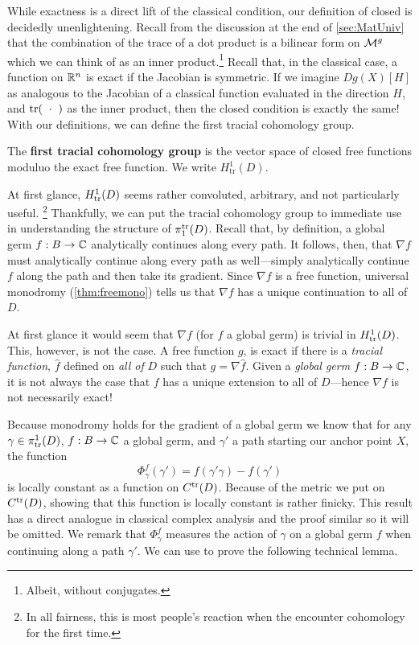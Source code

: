 While exactness is a direct lift of the classical condition, our definition of
closed is decidedly unenlightening. Recall from the discussion at the end of
\cref{sec:MatUniv} that the combination of the trace of a dot product is a
bilinear form on \(\mathcal{M}^{g} \) which we can think of as an inner
product.\footnote{Albeit, without conjugates.}
Recall that, in the classical case, a function on \(\mathbb{R} ^n\) is exact if the
Jacobian is symmetric.
If we imagine \(Dg(X)[H]\) as analogous to the Jacobian of a classical function
evaluated in the direction \(H\), and \(\operatorname{tr} (\;\; \cdot \;\;)\) as the
inner product, then the closed condition is exactly the same!
With our definitions, we can
define the first tracial cohomology group.

\begin{definition}%
\label{def:firsttrcohomo}
  The \textbf{first tracial cohomology group} is the vector space of closed free
  functions moduluo the exact free function. We write \(H^1_{\textrm{tr}}(D) \).
\end{definition}

At first glance, \(H^1_{\operatorname{tr}}(D)\) seems rather convoluted, arbitrary, and not
particularly useful.
\footnote{In all fairness, this is most people's reaction when the encounter
  cohomology for the first time.}
Thankfully, we can put the tracial cohomology group to immediate use in
understanding the structure of \(\pi_1^{\operatorname{tr}}(D)\). Recall that, by definition, a
global germ \(f:B\to \mathbb{C} \) analytically continues along every path. It follows,
then, that \(\nabla f\) must analytically continue along every path as
well---simply analytically continue \(f\) along the path and then take its
gradient. Since \(\nabla f \) is a free function, universal monodromy
(\cref{thm:freemono}) tells us that \(\nabla f\) has a unique continuation to
all of \(D\).

At first glance it would seem that \(\nabla f\) (for \(f\) a
global germ) is trivial in \(H_{\operatorname{tr}}^1(D)\). This, however, is not the case. A
free function \(g\), is exact if there is a \emph{tracial function}, \(\hat{f}\)
defined on \emph{all of} \(D\) such that \(g= \nabla \hat{f}\). Given a
\emph{global germ} \(f: B \to \mathbb{C} \), it is not always the case that \(f\) has a
unique extension to all of \(D\)---hence \(\nabla f \) is not necessarily exact!



Because monodromy holds for the gradient of a global germ we know that for any
\(\gamma \in \pi_{\operatorname{tr}}^1(D)\), \(f:B\to \mathbb{C} \) a global germ, and \(\gamma'\) a
path starting our anchor point \(X\), the function
\[
  \Phi_\gamma^f (\gamma')= f(\gamma'\gamma)-f(\gamma')
\]
is locally constant as a function on \(C^{\operatorname{tr}}(D)\). Because of the metric we
put on \(C^{\operatorname{tr}}(D)\), showing that this function
is locally constant is rather finicky. This result has a direct analogue in
classical complex analysis and the proof similar so it will be omitted.
We remark that \(\Phi_\gamma^f\) measures the action of \(\gamma\) on a global
germ \(f\) when continuing along a path \(\gamma'\). We can use to prove the
following technical lemma.


